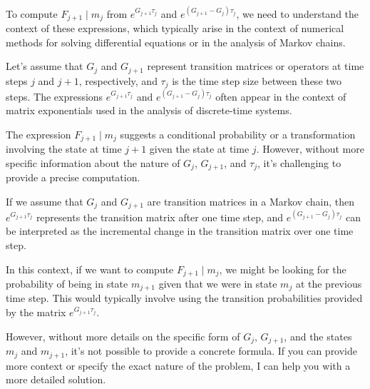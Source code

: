 To compute \( F_{j+1} \mid m_j \) from \( e^{G_{j+1} \tau_j} \) and \( e^{(G_{j+1} - G_j) \tau_j} \), we need to understand the context of these expressions, which typically arise in the context of numerical methods for solving differential equations or in the analysis of Markov chains.

Let's assume that \( G_j \) and \( G_{j+1} \) represent transition matrices or operators at time steps \( j \) and \( j+1 \), respectively, and \( \tau_j \) is the time step size between these two steps. The expressions \( e^{G_{j+1} \tau_j} \) and \( e^{(G_{j+1} - G_j) \tau_j} \) often appear in the context of matrix exponentials used in the analysis of discrete-time systems.

The expression \( F_{j+1} \mid m_j \) suggests a conditional probability or a transformation involving the state at time \( j+1 \) given the state at time \( j \). However, without more specific information about the nature of \( G_j \), \( G_{j+1} \), and \( \tau_j \), it's challenging to provide a precise computation.

If we assume that \( G_j \) and \( G_{j+1} \) are transition matrices in a Markov chain, then \( e^{G_{j+1} \tau_j} \) represents the transition matrix after one time step, and \( e^{(G_{j+1} - G_j) \tau_j} \) can be interpreted as the incremental change in the transition matrix over one time step.

In this context, if we want to compute \( F_{j+1} \mid m_j \), we might be looking for the probability of being in state \( m_{j+1} \) given that we were in state \( m_j \) at the previous time step. This would typically involve using the transition probabilities provided by the matrix \( e^{G_{j+1} \tau_j} \).

However, without more details on the specific form of \( G_j \), \( G_{j+1} \), and the states \( m_j \) and \( m_{j+1} \), it's not possible to provide a concrete formula. If you can provide more context or specify the exact nature of the problem, I can help you with a more detailed solution.